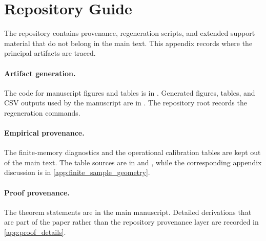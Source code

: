 \section{Repository Guide}\label{app:repository_guide}

The repository contains provenance, regeneration scripts, and extended support
material that do not belong in the main text. This appendix records where the
principal artifacts are traced.

\paragraph{Artifact generation.}
The code for manuscript figures and tables is in
. Generated figures, tables, and CSV outputs
used by the manuscript are in . The repository root
 records the regeneration commands.

\paragraph{Empirical provenance.}
The finite-memory diagnostics and the operational calibration tables are kept
out of the main text. The table sources are in
 and
, while the
corresponding appendix discussion is in \cref{app:finite_sample_geometry}.

\paragraph{Proof provenance.}
The theorem statements are in the main manuscript. Detailed derivations that are
part of the paper rather than the repository provenance layer are recorded in
\cref{app:proof_details}.
